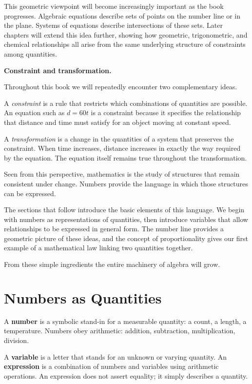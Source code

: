 \documentclass[11pt, openany]{book}
\theoremstyle{plain}
\theoremstyle{definition}
\theoremstyle{remark}
\begin{document}
This geometric viewpoint will become increasingly important as the book
progresses. Algebraic equations describe sets of points on the number
line or in the plane. Systems of equations describe intersections of
these sets. Later chapters will extend this idea further, showing how
geometric, trigonometric, and chemical relationships all arise from the
same underlying structure of constraints among quantities.

\medskip

\textbf{Constraint and transformation.}

Throughout this book we will repeatedly encounter two complementary
ideas.

A \emph{constraint} is a rule that restricts which combinations of
quantities are possible. An equation such as \(d = 60t\) is a constraint
because it specifies the relationship that distance and time must
satisfy for an object moving at constant speed.

A \emph{transformation} is a change in the quantities of a system that
preserves the constraint. When time increases, distance increases in
exactly the way required by the equation. The equation itself remains
true throughout the transformation.

Seen from this perspective, mathematics is the study of structures that
remain consistent under change. Numbers provide the language in which
those structures can be expressed.

\medskip

The sections that follow introduce the basic elements of this language.
We begin with numbers as representations of quantities, then introduce
variables that allow relationships to be expressed in general form. The
number line provides a geometric picture of these ideas, and the concept
of proportionality gives our first example of a mathematical law linking
two quantities together.

From these simple ingredients the entire machinery of algebra will grow.

\section{Numbers as Quantities}

A \textbf{number} is a symbolic stand-in for a measurable quantity: a count, a
length, a temperature. Numbers obey arithmetic: addition, subtraction,
multiplication, division.

\begin{mydefinition}[Variable]
A \textbf{variable} is a letter that stands for an unknown or varying quantity.
An \textbf{expression} is a combination of numbers and variables using
arithmetic operations. An expression does not assert equality; it simply
describes a quantity.
\end{mydefinition}
\end{document}
